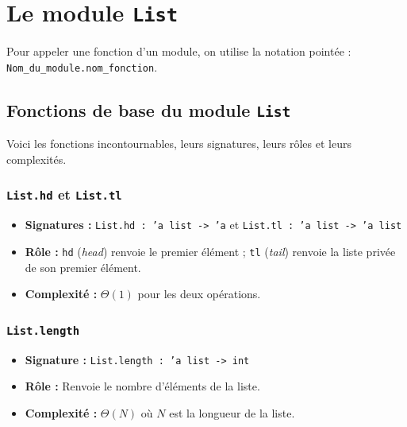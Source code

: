 \documentclass{article}
\begin{document}

\section{Le module \texttt{List}}


\noindent Pour appeler une fonction d'un module, on utilise la notation pointée : \texttt{Nom\_du\_module.nom\_fonction}.

\subsection{Fonctions de base du module \texttt{List}}

Voici les fonctions incontournables, leurs signatures, leurs rôles et leurs complexités.

\subsubsection{\texttt{List.hd} et \texttt{List.tl}}
\begin{itemize}
    \item \textbf{Signatures :} \texttt{List.hd : 'a list -> 'a} et \texttt{List.tl : 'a list -> 'a list}
    \item \textbf{Rôle :} \texttt{hd} (\textit{head}) renvoie le premier élément ; \texttt{tl} (\textit{tail}) renvoie la liste privée de son premier élément.
    \item \textbf{Complexité :} $\Theta(1)$ pour les deux opérations.
\end{itemize}


\subsubsection{\texttt{List.length}}
\begin{itemize}
    \item \textbf{Signature :} \texttt{List.length : 'a list -> int}
    \item \textbf{Rôle :} Renvoie le nombre d'éléments de la liste.
    \item \textbf{Complexité :} $\Theta(N)$ où $N$ est la longueur de la liste.
\end{itemize}
\end{document}
